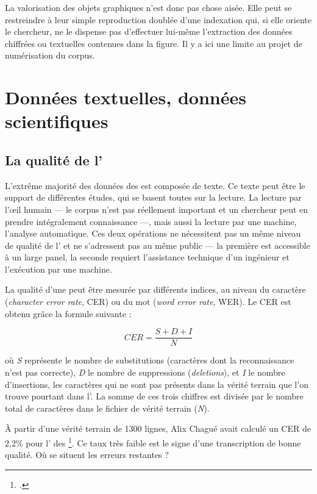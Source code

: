 La valorisation des objets graphiques n'est donc pas chose aisée. Elle peut se restreindre à leur simple reproduction doublée d'une indexation qui, si elle oriente le chercheur, ne le dispense pas d'effectuer lui-même l'extraction des données chiffrées ou textuelles contenues dans la figure. Il y a ici une limite au projet de numérisation du corpus.

\chapter{Données textuelles, données scientifiques}

\section{La qualité de l'\ocr}

L'extrême majorité des données des \odm{} est composée de texte. Ce texte peut être le support de différentes études, qui se basent toutes sur la lecture. La lecture par l'\oe{}il humain --- le corpus n'est pas réellement important et un chercheur peut en prendre intégralement connaissance ---, mais aussi la lecture par une machine, \cad{} l'analyse automatique. Ces deux opérations ne nécessitent pas un même niveau de qualité de l'\ocr{} et ne s'adressent pas au même public --- la première est accessible à un large panel, la seconde requiert l'assistance technique d'un ingénieur et l'exécution par une machine.

La qualité d'une \ocr{} peut être mesurée par différents indices, au niveau du caractère (\textit{character error rate}, CER) ou du mot (\textit{word error rate}, WER).  Le CER est obtenu grâce la formule suivante :

\[CER = \frac{S + D + I}{N}\]

où \textit{S} représente le nombre de substitutions (caractères dont la reconnaissance n'est pas correcte), \textit{D} le nombre de suppressions (\textit{deletions}), et \textit{I} le nombre d'insertions, \cad{} les caractères qui ne sont pas présents dans la vérité terrain que l'on trouve pourtant dans l'\ocr. La somme de ces trois chiffres est divisée par le nombre total de caractères dans le fichier de vérité terrain (\textit{N}).

À partir d'une vérité terrain de 1300 lignes, Alix Chagué avait calculé un CER de 2,2\% pour l'\ocr{} des \odm\footcite[slide 16]{inria-pp}. Ce taux très faible est le signe d'une transcription de bonne qualité. Où se situent les erreurs restantes ?

